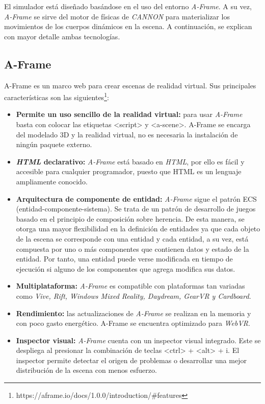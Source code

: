El simulador está diseñado basándose en el uso del entorno \textit{A-Frame}. A su vez, \textit{A-Frame} se sirve del motor de físicas de \textit{CANNON} para materializar los movimientos de los cuerpos dinámicos en la escena. A continuación, se explican con mayor detalle ambas tecnologías.

\subsection{A-Frame}
A-Frame es un marco web para crear escenas de realidad virtual. Sus principales características son las siguientes\footnote{https://aframe.io/docs/1.0.0/introduction/#features}:

\begin{itemize}
    \item \textbf{Permite un uso sencillo de la realidad virtual:} para usar \textit{A-Frame} basta con colocar las etiquetas <script> y <a-scene>. A-Frame se encarga del modelado 3D y la realidad virtual, no es necesaria la instalación de ningún paquete externo.
    \item \textbf{\textit{HTML} declarativo:} \textit{A-Frame} está basado en \textit{HTML}, por ello es fácil y accesible para cualquier programador, puesto que HTML es un lenguaje ampliamente conocido.
    \item \textbf{Arquitectura de componente de entidad:} \textit{A-Frame} sigue el patrón ECS (entidad-componente-sistema). Se trata de un patrón de desarrollo de juegos basado en el principio de composición sobre herencia. De esta manera, se otorga una mayor flexibilidad en la definición de entidades ya que cada objeto de la escena se corresponde con una entidad y cada entidad, a su vez, está compuesta por uno o más componentes que contienen datos y estado de la entidad. Por tanto, una entidad puede verse modificada en tiempo de ejecución si alguno de los componentes que agrega modifica sus datos.
    \item \textbf{Multiplataforma: } \textit{A-Frame} es compatible con plataformas tan variadas como \textit{Vive, Rift, Windows Mixed Reality, Daydream, GearVR y Cardboard}.
    \item \textbf{Rendimiento:} las actualizaciones de \textit{A-Frame} se realizan en la memoria y con poco gasto energético. A-Frame se encuentra optimizado para \textit{WebVR}.
    \item  \textbf{Inspector visual:} \textit{A-Frame} cuenta con un inspector visual integrado. Este se despliega al presionar la combinación de teclas <ctrl> + <alt> + i. El inspector permite detectar el origen de problemas o desarrollar una mejor distribución de la escena con menos esfuerzo.

\end{itemize}
